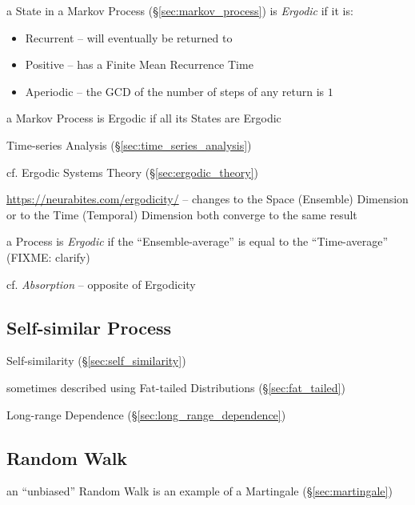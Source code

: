 a State in a Markov Process (\S\ref{sec:markov_process}) is \emph{Ergodic} if it
is:
\begin{itemize}
  \item Recurrent -- will eventually be returned to
  \item Positive -- has a Finite Mean Recurrence Time
  \item Aperiodic -- the GCD of the number of steps of any return is $1$
\end{itemize}
a Markov Process is Ergodic if all its States are Ergodic

\fist Time-series Analysis (\S\ref{sec:time_series_analysis})

\fist cf. Ergodic Systems Theory (\S\ref{sec:ergodic_theory})

\url{https://neurabites.com/ergodicity/} -- changes to the Space (Ensemble)
Dimension or to the Time (Temporal) Dimension both converge to the same result

a Process is \emph{Ergodic} if the ``Ensemble-average'' is equal to the
``Time-average'' (FIXME: clarify)

cf. \emph{Absorption} -- opposite of Ergodicity



\subsection{Self-similar Process}\label{sec:self_similar}

Self-similarity (\S\ref{sec:self_similarity})

sometimes described using Fat-tailed Distributions (\S\ref{sec:fat_tailed})

Long-range Dependence (\S\ref{sec:long_range_dependence})



\subsection{Random Walk}\label{sec:random_walk}


an ``unbiased'' Random Walk is an example of a Martingale
(\S\ref{sec:martingale})

